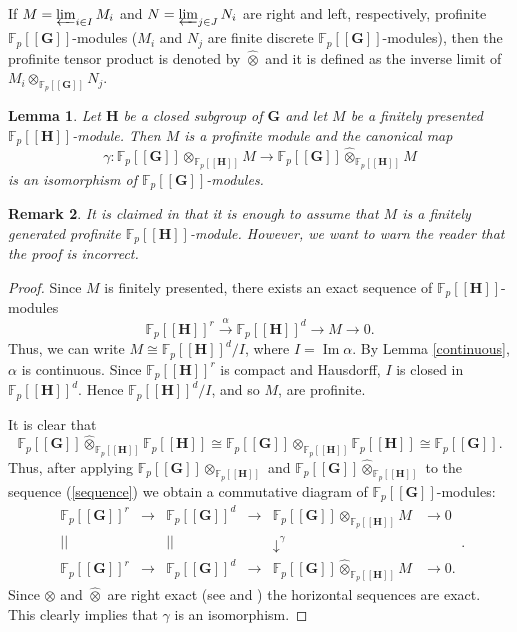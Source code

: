 \documentclass[11pt]{amsart}
\newtheorem{lem}{Lemma}[section]
\newtheorem{rem}[lem]{Remark}
\numberwithin{claimcounter}{lem}
\DeclareMathOperator{\im}{Im}
\newcommand{\F}{\mathbb{F}}
\begin{document}
  
   If $M=\varprojlim_{i\in I} M_i$ and $N=\varprojlim_{j\in J} N_i$ are right and left, respectively,  profinite $\F_p[[\mathbf G]]$-modules ($M_i$ and  $N_j$ are finite discrete $\F_p[[\mathbf G]]$-modules), then the profinite tensor product is denoted by $\widehat \otimes$ and it is defined as the inverse limit of $M_i\otimes_{\F_p[[\mathbf G]]}N_j$.
\begin{lem}\label{profinitetensor}
Let 
 $\mathbf H$ be  a closed subgroup of $\mathbf G$ and let $M$ be a finitely presented $\F_p[[\mathbf H]]$-module. Then $M$ is a profinite module and  the canonical map $$\gamma:\F_p[[\mathbf G]]\otimes_{\F_p[[\mathbf H]]}M\to \F_p[[\mathbf G]]\widehat \otimes_{\F_p[[\mathbf H]]} M$$ is an isomorphism of $\F_p[[\mathbf G]]$-modules.
 \end{lem}
 \begin{rem}
 It is claimed in \cite[Proposition 5.5.3 (d)]{RZ10}   that it is enough to assume that $M$ is a  finitely generated profinite $\F_p[[\mathbf H]]$-module. However, we want to warn  the reader that the proof  is incorrect.
 \end{rem}
 \begin{proof} Since $M$ is finitely presented, there exists an exact sequence of $\F_p[[\mathbf H]]$-modules
\begin{equation}\label{sequence}
 \F_p[[\mathbf H]]^r\xrightarrow{\alpha} \F_p[[\mathbf H]]^d\to M\to 0.
 \end{equation}
  Thus, we can write  $M\cong \F_p[[\mathbf H]]^d/I$, where $I=\im \alpha$. By Lemma \ref{continuous},  $\alpha$ is continuous.   Since  $\F_p[[\mathbf H]]^r$ is compact and Hausdorff, $I$ is closed in  $\F_p[[\mathbf H]]^d$. Hence  $\F_p[[\mathbf H]]^d/I$, and so $M$, are profinite.

 It is clear that 
$$\F_p[[\mathbf G]]\widehat \otimes_{\F_p[[\mathbf H]] } \F_p[[\mathbf H]]\cong \F_p[[\mathbf G]] \otimes_{\F_p[[\mathbf H]] }\F_p[[\mathbf H]]\cong \F_p[[\mathbf G]] .$$ Thus,
after applying $\F_p[[\mathbf G]]\otimes _{\F_p[[\mathbf H]] }$ and  $\F_p[[\mathbf G]]{\widehat \otimes} _{\F_p[[\mathbf H]] }$ to the sequence (\ref{sequence}) we obtain a commutative diagram of $\F_p[[\mathbf G]]$-modules:
$$\begin{array}{cccccc}
 \F_p[[\mathbf G]]^r & \to &  \F_p[[\mathbf G]]^d & \to&  \F_p[[\mathbf G]]\otimes _{\F_p[[\mathbf H]]} M &\to 0\\
 ||&&||&&\downarrow^\gamma&\\
  \F_p[[\mathbf G]]^r & \to &  \F_p[[\mathbf G]]^d & \to&  \F_p[[\mathbf G]]\widehat \otimes _{\F_p[[\mathbf H]]} M &\to 0.
\end{array}.
$$
Since $\otimes$ and $\widehat \otimes $ are right  exact (see \cite[Theorem 2.6.3]{Ro09} and \cite[Proposition 5.5.3(a)]{RZ10}) the horizontal sequences are exact.  This clearly implies that $\gamma$ is an isomorphism. \end{proof}
 
\end{document}
